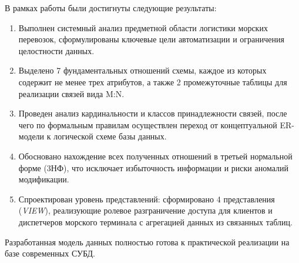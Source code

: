 \documentclass[a4paper,14pt]{article}
\begin{document}
В рамках работы были достигнуты следующие результаты:
\begin{enumerate}
    \item Выполнен системный анализ предметной области логистики морских перевозок, сформулированы ключевые цели автоматизации и ограничения целостности данных.
    \item Выделено 7 фундаментальных отношений схемы, каждое из которых содержит не менее трех атрибутов, а также 2 промежуточные таблицы для реализации связей вида M:N.
    \item Проведен анализ кардинальности и классов принадлежности связей, после чего по формальным правилам осуществлен переход от концептуальной ER-модели к логической схеме базы данных.
    \item Обосновано нахождение всех полученных отношений в третьей нормальной форме (3НФ), что исключает избыточность информации и риски аномалий модификации.
    \item Спроектирован уровень представлений: сформировано 4 представления (\textit{VIEW}), реализующие ролевое разграничение доступа для клиентов и диспетчеров морского терминала с агрегацией данных из связанных таблиц.
\end{enumerate}

Разработанная модель данных полностью готова к практической реализации на базе современных СУБД.
\end{document}

